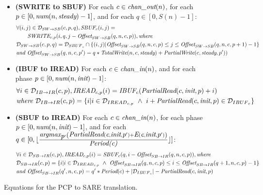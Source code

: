 \begin{figure}[p]
{\begin{minipage}{6.3in}
\begin{itemize}
%
\item {\bf(SWRITE to SBUF)} For each $c \in \mbox{\it chan\_out}(n)$, for each $p \in [0,
\mbox{\it num}(n, \mbox{\it steady})-1]$, and for each $q \in [0,S(n)-1]$:
\begin{align}
\label{swrite2sbuf}
&\forall (i,j) \in {\cal D}_{SW {\small \rightarrow} SB}(c,p,q),
\mbox{\it SBUF}_{c}(i,j) = \nonumber\\
&~~~~~~\mbox{\it SWRITE}_{c, p}(i, q,
                     j - \mbox{\it Offset}_{SW {\small \rightarrow} SB}(q,n,c,p)),
\mbox{\it where } \\&{\cal D}_{SW {\small \rightarrow} SB}(c,p,q) = 
  {\cal D}_{{SBUF}_{c}} \cap 
  \{ (i,j) | \mbox{\it Offset}_{SW {\small \rightarrow} SB}(q,n,c,p) \le j
             \le \mbox{\it Offset}_{SW {\small \rightarrow} SB}(q,n,c,p+1) - 1 \} \nonumber\\\nonumber
&\mbox{\it and } \mbox{\it Offset}_{SW {\small \rightarrow} SB}(q,n,c,p') = q*\mbox{\it TotalWrite}(n,c,\mbox{\it steady}) + \mbox{\it PartialWrite}(c,\mbox{\it steady},p'))
\end{align}
%
\item {\bf(IBUF to IREAD)} For each $c \in \mbox{\it chan\_in}(n)$, and for each phase $p \in
[0, \mbox{\it num}(n, \mbox{\it init})-1]$:
\begin{align}
\label{ibuf2iread}
&\forall i \in {\cal D}_{IB {\small \rightarrow} IR}(c,p), 
\mbox{\it IREAD}_{c, p}(i) = \mbox{\it IBUF}_{c}(\mbox{\it PartialRead}(c, \mbox{\it init}, p) + i) \\ \nonumber
&\mbox{\it where }{\cal D}_{IB {\small \rightarrow} IR}(c,p) = 
  \{ i | i \in {\cal D}_{{IREAD}_{c,p}} ~\wedge~ 
         i + \mbox{\it PartialRead}(c, \mbox{\it init}, p) \in {\cal D}_{{IBUF}_{c}} \}
\end{align}
%
\item {\bf(SBUF to IREAD)} For each $c \in \mbox{\it chan\_in}(n)$, for each phase $p \in [0,
\mbox{\it num}(n, \mbox{\it init})-1]$, and for each \\$q \in [0, \lfloor
\frac{\mbox{\it argmax}_{\mbox{\it p}'} \left( \mbox{\it PartialRead}(\mbox{\it c}, \mbox{\it init},
\mbox{\it p}') + \mbox{\it E}(\mbox{\it c}, \mbox{\it init}, \mbox{\it p}') \right)
}{\mbox{\it Period(c)}} \rfloor ]$:
\begin{align}
\label{sbuf2iread}
&\forall i \in {\cal D}_{SB {\small \rightarrow} IR}(c,p), 
\mbox{\it IREAD}_{c,p}(i) = 
    \mbox{\it SBUF}_{c}(q,
      i - \mbox{\it Offset}_{SB {\small \rightarrow} IR}(q,n,c,p)), \mbox{\it where } \\ \nonumber
&{\cal D}_{SB {\small \rightarrow} IR}(c,p) = 
  \{ i | i \in {\cal D}_{{IREAD}_{c,p}} ~\wedge~
         \mbox{\it Offset}_{SB {\small \rightarrow} IR}(q,n,c,p)
         \le i \le
         \mbox{\it Offset}_{SB {\small \rightarrow} IR}(q+1,n,c,p) - 1 \} \\ \nonumber
&\mbox{\it and }\mbox{\it Offset}_{SB {\small \rightarrow} IR}(q',n,c,p) = 
  q' * \mbox{\it Period}(c) + |{\cal D}_{{IBUF}_c}| - \mbox{\it PartialRead}(c,\mbox{\it init},p)
\end{align}
%
\end{itemize}
\end{minipage}}
\caption{Equations for the PCP to SARE translation.
\protect\label{fig:pcptosare2}}
\end{figure}

